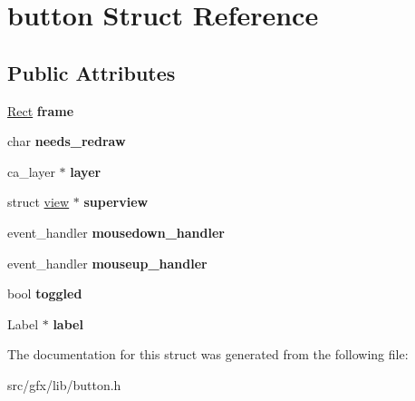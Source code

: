 \hypertarget{structbutton}{}\section{button Struct Reference}
\label{structbutton}
\subsection*{Public Attributes}
\begin{DoxyCompactItemize}
\item 
\mbox{\label{structbutton_a716ba0291a5920c901ec60b550803689}} 
\hyperlink{structrect}{Rect} {\bfseries frame}
\item 
\mbox{\label{structbutton_a90c125bbe507df0f2a8ca91a564bff27}} 
char {\bfseries needs\+\_\+redraw}
\item 
\mbox{\label{structbutton_a66a056d4b9fc5804ab81fc7548aae9be}} 
ca\+\_\+layer $\ast$ {\bfseries layer}
\item 
\mbox{\label{structbutton_a14a347687f4af74a4d13ba7aad7f7be3}} 
struct \hyperlink{structview}{view} $\ast$ {\bfseries superview}
\item 
\mbox{\label{structbutton_a2060f2fffa60f113dd9d0790d2c1099b}} 
event\+\_\+handler {\bfseries mousedown\+\_\+handler}
\item 
\mbox{\label{structbutton_a34d40e89ad2a199240ece8e8dca5135c}} 
event\+\_\+handler {\bfseries mouseup\+\_\+handler}
\item 
\mbox{\label{structbutton_abaa959171b6b795131d32ff225267b77}} 
bool {\bfseries toggled}
\item 
\mbox{\label{structbutton_a1dcf11ba178b2fbadece99a3861d18f4}} 
Label $\ast$ {\bfseries label}
\end{DoxyCompactItemize}


The documentation for this struct was generated from the following file\+:\begin{DoxyCompactItemize}
\item 
src/gfx/lib/button.\+h\end{DoxyCompactItemize}
